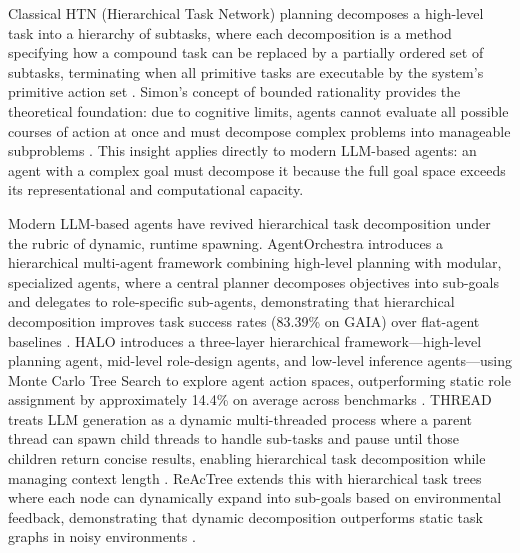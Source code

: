 Classical HTN (Hierarchical Task Network) planning decomposes a high-level task into a hierarchy of subtasks, where each decomposition is a method specifying how a compound task can be replaced by a partially ordered set of subtasks, terminating when all primitive tasks are executable by the system's primitive action set \cite{ghallab2004htn}. Simon's concept of bounded rationality provides the theoretical foundation: due to cognitive limits, agents cannot evaluate all possible courses of action at once and must decompose complex problems into manageable subproblems \cite{simon,erpl}. This insight applies directly to modern LLM-based agents: an agent with a complex goal must decompose it because the full goal space exceeds its representational and computational capacity.

Modern LLM-based agents have revived hierarchical task decomposition under the rubric of dynamic, runtime spawning. AgentOrchestra introduces a hierarchical multi-agent framework combining high-level planning with modular, specialized agents, where a central planner decomposes objectives into sub-goals and delegates to role-specific sub-agents, demonstrating that hierarchical decomposition improves task success rates (83.39\% on GAIA) over flat-agent baselines \cite{agentorchestra2025}. HALO introduces a three-layer hierarchical framework---high-level planning agent, mid-level role-design agents, and low-level inference agents---using Monte Carlo Tree Search to explore agent action spaces, outperforming static role assignment by approximately 14.4\% on average across benchmarks \cite{halo2025}. THREAD treats LLM generation as a dynamic multi-threaded process where a parent thread can spawn child threads to handle sub-tasks and pause until those children return concise results, enabling hierarchical task decomposition while managing context length \cite{thread2025}. ReAcTree extends this with hierarchical task trees where each node can dynamically expand into sub-goals based on environmental feedback, demonstrating that dynamic decomposition outperforms static task graphs in noisy environments \cite{reactree2025}.

